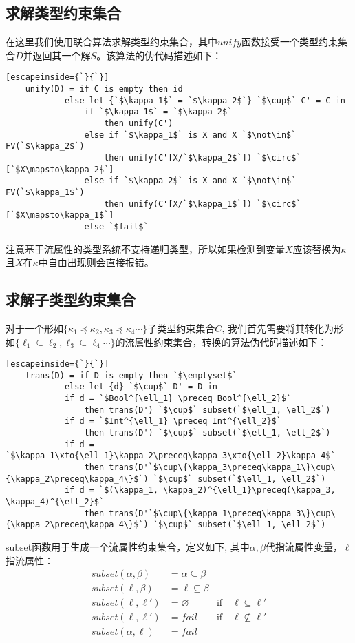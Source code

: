 \documentclass[12pt, titlepage]{article}
\newcommand{\xto}{\xrightarrow}
\let\emptyset\varnothing
\begin{document}
	\subsection{求解类型约束集合}
	在这里我们使用联合算法求解类型约束集合，其中$unify$函数接受一个类型约束集合$D$并返回其一个解$S$。该算法的伪代码描述如下：
	\begin{lstlisting}[escapeinside={`}{`}]
	unify(D) = if C is empty then id
			else let {`$\kappa_1$` = `$\kappa_2$`} `$\cup$` C' = C in
				if `$\kappa_1$` = `$\kappa_2$` 
					then unify(C')
				else if `$\kappa_1$` is X and X `$\not\in$` FV(`$\kappa_2$`) 
					then unify(C'[X/`$\kappa_2$`]) `$\circ$` [`$X\mapsto\kappa_2$`]
				else if `$\kappa_2$` is X and X `$\not\in$` FV(`$\kappa_1$`)
					then unify(C'[X/`$\kappa_1$`]) `$\circ$` [`$X\mapsto\kappa_1$`]
				else `$fail$`
	\end{lstlisting}
	注意基于流属性的类型系统不支持递归类型，所以如果检测到变量$X$应该替换为$\kappa$且$X$在$\kappa$中自由出现则会直接报错。
	
	\subsection{求解子类型约束集合}
	对于一个形如$\{\kappa_1\preceq\kappa_2, \kappa_3\preceq\kappa_4\cdots\}$子类型约束集合$C$, 我们首先需要将其转化为形如$\{\ell_1\subseteq\ell_2, \ell_3\subseteq\ell_4\cdots\}$的流属性约束集合，转换的算法伪代码描述如下：
	\begin{lstlisting}[escapeinside={`}{`}]
	trans(D) = if D is empty then `$\emptyset$`
			else let {d} `$\cup$` D' = D in
			if d = `$Bool^{\ell_1} \preceq Bool^{\ell_2}$` 
				then trans(D') `$\cup$` subset(`$\ell_1, \ell_2$`)
			if d = `$Int^{\ell_1} \preceq Int^{\ell_2}$`
				then trans(D') `$\cup$` subset(`$\ell_1, \ell_2$`)
			if d = `$\kappa_1\xto{\ell_1}\kappa_2\preceq\kappa_3\xto{\ell_2}\kappa_4$`
				then trans(D'`$\cup\{\kappa_3\preceq\kappa_1\}\cup\{\kappa_2\preceq\kappa_4\}$`) `$\cup$` subset(`$\ell_1, \ell_2$`)
			if d = `$(\kappa_1, \kappa_2)^{\ell_1}\preceq(\kappa_3, \kappa_4)^{\ell_2}$`
				then trans(D'`$\cup\{\kappa_1\preceq\kappa_3\}\cup\{\kappa_2\preceq\kappa_4\}$`) `$\cup$` subset(`$\ell_1, \ell_2$`)
	\end{lstlisting}
	subset函数用于生成一个流属性约束集合，定义如下, 其中$\alpha, \beta$代指流属性变量，$\ell$指流属性：
	\begin{align*}
		subset(\alpha, \beta) &= \alpha\subseteq\beta\\
		subset(\ell, \beta) &= \ell\subseteq\beta\\
		subset(\ell, \ell') &= \emptyset&\text{if}\quad \ell\subseteq\ell'\\
		subset(\ell, \ell') &= fail&\text{if}\quad \ell\not\subseteq\ell'\\
		subset(\alpha, \ell) &= fail
	\end{align*}
\end{document}
